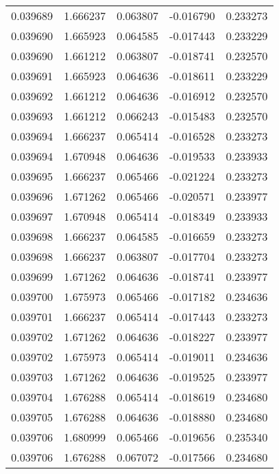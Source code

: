 \begin{tabular}{lrrrr}
0.039689    &  1.666237 &  0.063807 & -0.016790 &             0.233273 \\
0.039690    &  1.665923 &  0.064585 & -0.017443 &             0.233229 \\
0.039690    &  1.661212 &  0.063807 & -0.018741 &             0.232570 \\
0.039691    &  1.665923 &  0.064636 & -0.018611 &             0.233229 \\
0.039692    &  1.661212 &  0.064636 & -0.016912 &             0.232570 \\
0.039693    &  1.661212 &  0.066243 & -0.015483 &             0.232570 \\
0.039694    &  1.666237 &  0.065414 & -0.016528 &             0.233273 \\
0.039694    &  1.670948 &  0.064636 & -0.019533 &             0.233933 \\
0.039695    &  1.666237 &  0.065466 & -0.021224 &             0.233273 \\
0.039696    &  1.671262 &  0.065466 & -0.020571 &             0.233977 \\
0.039697    &  1.670948 &  0.065414 & -0.018349 &             0.233933 \\
0.039698    &  1.666237 &  0.064585 & -0.016659 &             0.233273 \\
0.039698    &  1.666237 &  0.063807 & -0.017704 &             0.233273 \\
0.039699    &  1.671262 &  0.064636 & -0.018741 &             0.233977 \\
0.039700    &  1.675973 &  0.065466 & -0.017182 &             0.234636 \\
0.039701    &  1.666237 &  0.065414 & -0.017443 &             0.233273 \\
0.039702    &  1.671262 &  0.064636 & -0.018227 &             0.233977 \\
0.039702    &  1.675973 &  0.065414 & -0.019011 &             0.234636 \\
0.039703    &  1.671262 &  0.064636 & -0.019525 &             0.233977 \\
0.039704    &  1.676288 &  0.065414 & -0.018619 &             0.234680 \\
0.039705    &  1.676288 &  0.064636 & -0.018880 &             0.234680 \\
0.039706    &  1.680999 &  0.065466 & -0.019656 &             0.235340 \\
0.039706    &  1.676288 &  0.067072 & -0.017566 &             0.234680 \\

\end{tabular}
